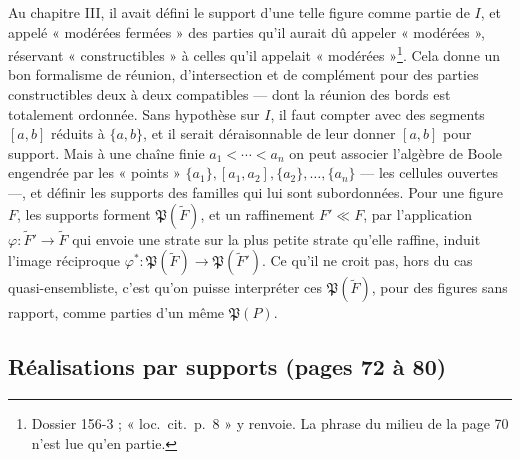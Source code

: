 \documentclass[11pt,a4paper]{article}
\begin{document}
Au chapitre III, il avait défini le support d'une telle figure comme partie de
$I$, et appelé « modérées fermées » des parties qu'il aurait dû appeler
« modérées », réservant « constructibles » à celles qu'il appelait
« modérées »\footnote{Dossier 156-3 ; « loc.\ cit.\ p.~8 » y renvoie. La phrase
du milieu de la page 70 n'est lue qu'en partie.}. Cela donne un bon formalisme
de réunion, d'intersection et de complément pour des parties constructibles deux
à deux compatibles --- dont la réunion des bords est totalement ordonnée. Sans
hypothèse sur $I$, il faut compter avec des segments $[a, b]$ réduits à $\{a,
b\}$, et il serait déraisonnable de leur donner $[a, b]$ pour support. Mais à une
chaîne finie $a_{1} < \cdots < a_{n}$ on peut associer l'algèbre de Boole engendrée
par les « points » $\{a_{1}\}, [a_{1}, a_{2}], \{a_{2}\}, \ldots, \{a_{n}\}$
--- les cellules ouvertes ---, et définir les supports des familles qui lui sont
subordonnées. Pour une figure $F$, les supports forment $\mathfrak{P}(\widetilde{F})$,
et un raffinement $F' \ll F$, par l'application $\varphi : \widetilde{F}' \to
\widetilde{F}$ qui envoie une strate sur la plus petite strate qu'elle raffine,
induit l'image réciproque $\varphi^{*} : \mathfrak{P}(\widetilde{F}) \to
\mathfrak{P}(\widetilde{F}')$. Ce qu'il ne croit pas, hors du cas
quasi-ensembliste, c'est qu'on puisse interpréter ces $\mathfrak{P}(\widetilde{F})$,
pour des figures sans rapport, comme parties d'un même $\mathfrak{P}(P)$.

\subsection*{Réalisations par supports (pages 72 à 80)}
\end{document}

